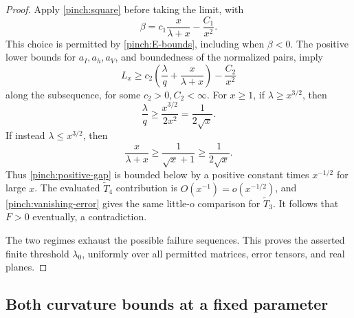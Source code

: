 \begin{proof}
Apply \eqref{pinch:square} before taking the limit, with
\[
 \beta=c_1\frac{x}{\lambda+x}-\frac{C_1}{x^2}.
\]
This choice is permitted by \eqref{pinch:E-bounds}, including when
\(\beta<0\).
The positive lower bounds for \(a_I,a_h,a_V\), and boundedness of the
normalized pairs, imply
\begin{equation}\label{pinch:positive-gap}
 L_x\ge c_2\left(\frac{\lambda}{q}
                  +\frac{x}{\lambda+x}\right)-\frac{C_2}{x^2}
\end{equation}
along the subsequence, for some \(c_2>0,C_2<\infty\).
For \(x\ge1\), if \(\lambda\ge x^{3/2}\), then
\[
 \frac{\lambda}{q}\ge\frac{x^{3/2}}{2x^2}
 =\frac1{2\sqrt x}.
\]
If instead \(\lambda\le x^{3/2}\), then
\[
 \frac{x}{\lambda+x}\ge\frac1{\sqrt x+1}
 \ge\frac1{2\sqrt x}.
\]
Thus \eqref{pinch:positive-gap} is bounded below by a positive
constant times \(x^{-1/2}\) for large \(x\).
The evaluated \(\widetilde T_4\) contribution is
\(O(x^{-1})=o(x^{-1/2})\), and
\eqref{pinch:vanishing-error} gives the same little-o comparison for
\(\widetilde T_3\).
It follows that \(F>0\) eventually, a contradiction.

The two regimes exhaust the possible failure sequences.
This proves the asserted finite threshold \(\lambda_0\), uniformly
over all permitted matrices, error tensors, and real planes.
\end{proof}

\subsection{Both curvature bounds at a fixed parameter}

